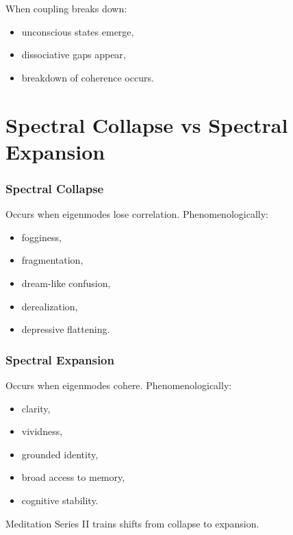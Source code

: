 \documentclass[12pt]{article}
\begin{document}
When coupling breaks down:

\begin{itemize}
    \item unconscious states emerge,
    \item dissociative gaps appear,
    \item breakdown of coherence occurs.
\end{itemize}

\section{Spectral Collapse vs Spectral Expansion}

\subsubsection*{Spectral Collapse}
Occurs when eigenmodes lose correlation.  
Phenomenologically:

\begin{itemize}
    \item fogginess,
    \item fragmentation,
    \item dream-like confusion,
    \item derealization,
    \item depressive flattening.
\end{itemize}

\subsubsection*{Spectral Expansion}
Occurs when eigenmodes cohere.  
Phenomenologically:

\begin{itemize}
    \item clarity,
    \item vividness,
    \item grounded identity,
    \item broad access to memory,
    \item cognitive stability.
\end{itemize}

Meditation Series II trains shifts from collapse to expansion.

\newpage

\end{document}
